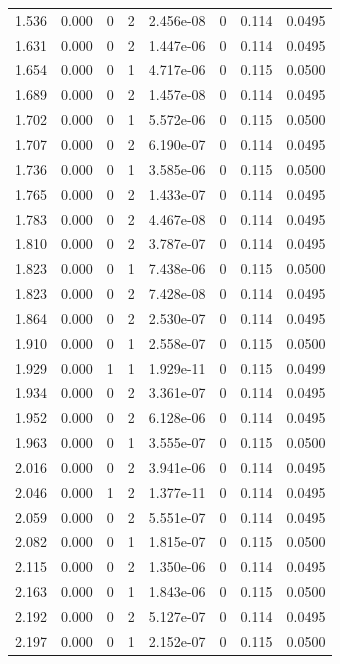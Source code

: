 \documentclass[preview]{standalone}
\begin{document}
{{{\begin{tabular}{L{1.2cm}C{1.2cm} C{0.3cm}C{0.5cm} C{1.4cm}C{1.4cm} C{1.4cm}C{1.4cm}}
  1.536  &  0.000  & 0     &  2 &  2.456e-08  & 0  & 0.114 &  0.0495   \\ 
  1.631  &  0.000  & 0     &  2 &  1.447e-06  & 0  & 0.114 &  0.0495   \\ 
  1.654  &  0.000  & 0     &  1 &  4.717e-06  & 0  & 0.115 &  0.0500   \\ 
  1.689  &  0.000  & 0     &  2 &  1.457e-08  & 0  & 0.114 &  0.0495   \\ 
  1.702  &  0.000  & 0     &  1 &  5.572e-06  & 0  & 0.115 &  0.0500   \\ 
  1.707  &  0.000  & 0     &  2 &  6.190e-07  & 0  & 0.114 &  0.0495   \\ 
  1.736  &  0.000  & 0     &  1 &  3.585e-06  & 0  & 0.115 &  0.0500   \\ 
  1.765  &  0.000  & 0     &  2 &  1.433e-07  & 0  & 0.114 &  0.0495   \\ 
  1.783  &  0.000  & 0     &  2 &  4.467e-08  & 0  & 0.114 &  0.0495   \\ 
  1.810  &  0.000  & 0     &  2 &  3.787e-07  & 0  & 0.114 &  0.0495   \\ 
  1.823  &  0.000  & 0     &  1 &  7.438e-06  & 0  & 0.115 &  0.0500   \\ 
  1.823  &  0.000  & 0     &  2 &  7.428e-08  & 0  & 0.114 &  0.0495   \\ 
  1.864  &  0.000  & 0     &  2 &  2.530e-07  & 0  & 0.114 &  0.0495   \\ 
  1.910  &  0.000  & 0     &  1 &  2.558e-07  & 0  & 0.115 &  0.0500   \\ 
  1.929  &  0.000  & 1     &  1 &  1.929e-11  & 0  & 0.115 &  0.0499   \\ 
  1.934  &  0.000  & 0     &  2 &  3.361e-07  & 0  & 0.114 &  0.0495   \\ 
  1.952  &  0.000  & 0     &  2 &  6.128e-06  & 0  & 0.114 &  0.0495   \\ 
  1.963  &  0.000  & 0     &  1 &  3.555e-07  & 0  & 0.115 &  0.0500   \\ 
  2.016  &  0.000  & 0     &  2 &  3.941e-06  & 0  & 0.114 &  0.0495   \\ 
  2.046  &  0.000  & 1     &  2 &  1.377e-11  & 0  & 0.114 &  0.0495   \\ 
  2.059  &  0.000  & 0     &  2 &  5.551e-07  & 0  & 0.114 &  0.0495   \\ 
  2.082  &  0.000  & 0     &  1 &  1.815e-07  & 0  & 0.115 &  0.0500   \\ 
  2.115  &  0.000  & 0     &  2 &  1.350e-06  & 0  & 0.114 &  0.0495   \\ 
  2.163  &  0.000  & 0     &  1 &  1.843e-06  & 0  & 0.115 &  0.0500   \\ 
  2.192  &  0.000  & 0     &  2 &  5.127e-07  & 0  & 0.114 &  0.0495   \\ 
  2.197  &  0.000  & 0     &  1 &  2.152e-07  & 0  & 0.115 &  0.0500   \\ 
\hline 
\end{tabular} 

}}}
\end{document}
